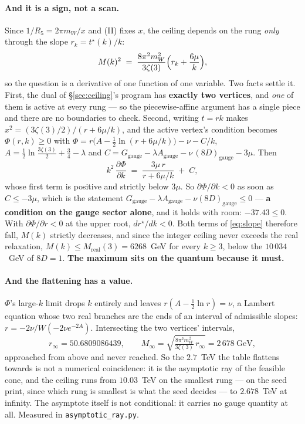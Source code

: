 \documentclass[11pt,a4paper]{article}
\begin{document}
\paragraph{And it is a sign, not a scan.} Since $1/R_5=2\pi m_W/x$ and (II) fixes $x$, the ceiling
depends on the rung \emph{only} through the slope $r_k=t^\star(k)/k$:
\begin{equation}\label{eq:slope}
  M(k)^2\;=\;\frac{8\pi^2m_W^2}{3\zeta(3)}\Bigl(r_k+\frac{6\mu}{k}\Bigr),
\end{equation}
so the question is a derivative of one function of one variable. Two facts settle it. First, the
dual of \S\ref{sec:ceiling}'s program has \textbf{exactly two vertices}, and \emph{one} of them is
active at every rung --- so the piecewise-affine argument has a single piece and there are no
boundaries to check. Second, writing $t=rk$ makes $x^2=(3\zeta(3)/2)/(r+6\mu/k)$, and the active
vertex's condition becomes $\Phi(r,k)\ge0$ with
$\Phi=r\bigl(A-\tfrac12\ln(r+6\mu/k)\bigr)-\nu-C/k$, $A=\tfrac12\ln\tfrac{3\zeta(3)}2+\tfrac34-\lambda$
and $C=G_{\text{gauge}}-\lambda A_{\text{gauge}}-\nu\,(8D)_{\text{gauge}}-3\mu$. Then
\begin{equation}\label{eq:dphidk}
  k^2\,\frac{\partial\Phi}{\partial k}\;=\;\frac{3\mu\,r}{r+6\mu/k}\;+\;C ,
\end{equation}
whose first term is positive and strictly below $3\mu$. So $\partial\Phi/\partial k<0$ as soon as
$C\le-3\mu$, which is the statement $G_{\text{gauge}}-\lambda A_{\text{gauge}}-\nu(8D)_{\text{gauge}}\le0$
--- \textbf{a condition on the gauge sector alone}, and it holds with room: $-37.43\le0$. With
$\partial\Phi/\partial r<0$ at the upper root, $dr^\star/dk<0$. Both terms of \eqref{eq:slope}
therefore fall, $M(k)$ strictly decreases, and since the integer ceiling never exceeds the real
relaxation, $M(k)\le M_{\text{real}}(3)=6268$~GeV for every $k\ge3$, below the $10\,034$~GeV of
$8D=1$. \textbf{The maximum sits on the quantum because it must.}

\paragraph{And the flattening has a value.} $\Phi$'s large-$k$ limit drops $k$ entirely and leaves
$r(A-\tfrac12\ln r)=\nu$, a Lambert equation whose two real branches are the ends of an interval of
admissible slopes: $r=-2\nu/W(-2\nu e^{-2A})$. Intersecting the two vertices' intervals,
\begin{equation}\label{eq:rinf}
  r_\infty=50.6809086439,\qquad
  M_\infty=\sqrt{\tfrac{8\pi^2m_W^2}{3\zeta(3)}\,r_\infty}=2\,678~\text{GeV},
\end{equation}
approached from above and never reached. So the $2.7$~TeV the table flattens towards is not a
numerical coincidence: it is the asymptotic ray of the feasible cone, and the ceiling runs from
$10.03$~TeV on the smallest rung --- on the seed \cite{KM25} print, since which rung is smallest is
what the seed decides --- to $2.678$~TeV at infinity. The asymptote itself is not conditional: it
carries no gauge quantity at all. Measured in
\texttt{asymptotic\_\allowbreak ray.py}.
\end{document}
